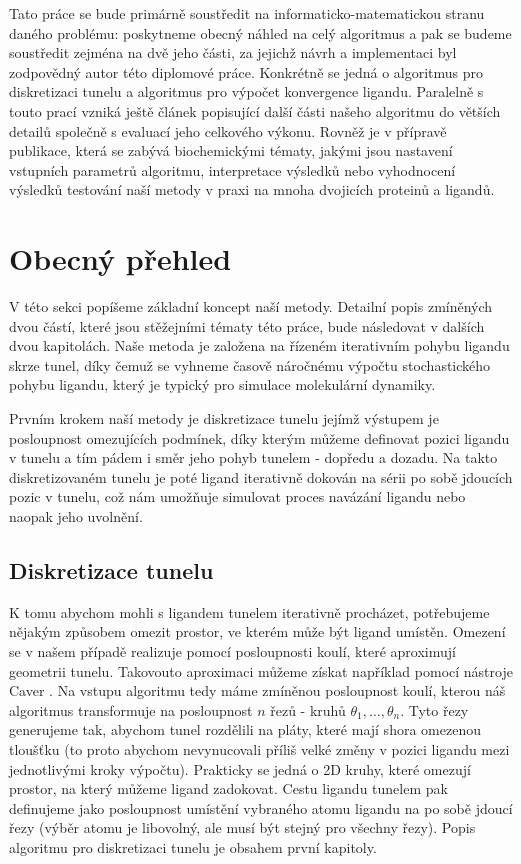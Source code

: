 Tato práce se bude primárně soustředit na informaticko-matematickou stranu
daného problému: poskytneme obecný náhled na celý algoritmus a pak se budeme
soustředit zejména na dvě jeho části, za jejichž návrh a implementaci byl
zodpovědný autor této diplomové práce. Konkrétně se jedná o algoritmus pro
diskretizaci tunelu a algoritmus pro výpočet konvergence ligandu. Paralelně
s touto prací vzniká ještě článek popisující další části našeho algoritmu
do větších detailů společně s evaluací jeho celkového výkonu. Rovněž je v přípravě
publikace, která se zabývá biochemickými tématy, jakými jsou nastavení
vstupních parametrů algoritmu, interpretace výsledků nebo vyhodnocení výsledků
testování naší metody v praxi na mnoha dvojicích proteinů a ligandů.





\section{Obecný přehled}
V této sekci popíšeme základní koncept naší metody. Detailní popis zmíněných
dvou částí, které jsou stěžejními tématy této práce, bude následovat v dalších
dvou kapitolách. Naše metoda je založena na řízeném iterativním pohybu ligandu
skrze tunel, díky čemuž se vyhneme časově náročnému výpočtu stochastického
pohybu ligandu, který je typický pro simulace molekulární dynamiky.

Prvním krokem naší metody je diskretizace tunelu jejímž výstupem je posloupnost
omezujících podmínek, díky kterým můžeme definovat pozici ligandu v tunelu a
tím pádem i směr jeho pohyb tunelem - dopředu a dozadu. Na takto diskretizovaném
tunelu je poté ligand iterativně dokován na sérii po sobě jdoucích pozic v tunelu,
což nám umožňuje simulovat proces navázání ligandu nebo naopak jeho uvolnění.





\subsection{Diskretizace tunelu}
K tomu abychom mohli s ligandem tunelem iterativně procházet, potřebujeme nějakým
způsobem omezit prostor, ve kterém může být ligand umístěn.
Omezení se v našem případě realizuje pomocí posloupnosti koulí, které aproximují
geometrii tunelu. Takovouto aproximaci můžeme získat například pomocí nástroje
Caver \cite{Caver}. Na vstupu algoritmu tedy máme zmíněnou posloupnost
koulí, kterou náš algoritmus transformuje na posloupnost $ n $ řezů - kruhů
$ \theta_1, \dots, \theta_n $. Tyto řezy generujeme tak, abychom tunel rozdělili
na pláty, které mají shora omezenou tloušťku (to proto abychom nevynucovali
příliš velké změny v pozici ligandu mezi jednotlivými kroky výpočtu). Prakticky
se jedná o 2D kruhy, které omezují prostor, na který můžeme ligand zadokovat.
Cestu ligandu tunelem pak definujeme jako posloupnost umístění vybraného atomu
ligandu na po sobě jdoucí řezy (výběr atomu je libovolný, ale musí být stejný
pro všechny řezy). Popis algoritmu pro diskretizaci tunelu je obsahem první kapitoly.

